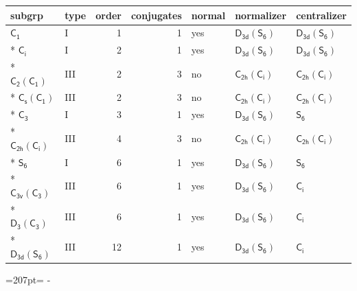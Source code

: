 \documentclass[10pt,a4paper]{article}
\newcommand{\needspace}[1]{\par\penalty-100\begingroup\dimen0=#1\relax\dimen2=\pagegoal
  \advance\dimen2-\pagetotal\ifdim\dimen0>\dimen2\relax\ifdim\dimen2>0pt\vfil\break\fi\fi
  \endgroup}
\numberwithin{equation}{section}
\newcommand{\grp}[1]{\mathsf{#1}}
\begin{document}
{\small\begin{longtable}{@{}llrrlll@{}}\toprule
subgrp & type & order & conjugates & normal & normalizer & centralizer\\\midrule\endhead
\bottomrule\endfoot\endlastfoot
\href{../../../rotation/data/pdf/C1.pdf}{$\grp{C_{1}}$} & I & 1 & 1 & yes & \href{D3d-S6.pdf}{$\grp{D_{3d}}(\grp{S_{6}})$} & \href{D3d-S6.pdf}{$\grp{D_{3d}}(\grp{S_{6}})$}\\*
\href{../../../rotation/data/pdf/S2.pdf}{$\grp{C_{i}}$} & I & 2 & 1 & yes & \href{D3d-S6.pdf}{$\grp{D_{3d}}(\grp{S_{6}})$} & \href{D3d-S6.pdf}{$\grp{D_{3d}}(\grp{S_{6}})$}\\*
\href{C2-C1.pdf}{$\grp{C_{2}}(\grp{C_{1}})$} & III & 2 & 3 & no & \href{C2h-S2.pdf}{$\grp{C_{2h}}(\grp{C_{i}})$} & \href{C2h-S2.pdf}{$\grp{C_{2h}}(\grp{C_{i}})$}\\*
\href{C1v-C1.pdf}{$\grp{C_{s}}(\grp{C_{1}})$} & III & 2 & 3 & no & \href{C2h-S2.pdf}{$\grp{C_{2h}}(\grp{C_{i}})$} & \href{C2h-S2.pdf}{$\grp{C_{2h}}(\grp{C_{i}})$}\\*
\href{../../../rotation/data/pdf/C3.pdf}{$\grp{C_{3}}$} & I & 3 & 1 & yes & \href{D3d-S6.pdf}{$\grp{D_{3d}}(\grp{S_{6}})$} & \href{../../../rotation/data/pdf/S6.pdf}{$\grp{S_{6}}$}\\*
\href{C2h-S2.pdf}{$\grp{C_{2h}}(\grp{C_{i}})$} & III & 4 & 3 & no & \href{C2h-S2.pdf}{$\grp{C_{2h}}(\grp{C_{i}})$} & \href{C2h-S2.pdf}{$\grp{C_{2h}}(\grp{C_{i}})$}\\*
\href{../../../rotation/data/pdf/S6.pdf}{$\grp{S_{6}}$} & I & 6 & 1 & yes & \href{D3d-S6.pdf}{$\grp{D_{3d}}(\grp{S_{6}})$} & \href{../../../rotation/data/pdf/S6.pdf}{$\grp{S_{6}}$}\\*
\href{C3v-C3.pdf}{$\grp{C_{3v}}(\grp{C_{3}})$} & III & 6 & 1 & yes & \href{D3d-S6.pdf}{$\grp{D_{3d}}(\grp{S_{6}})$} & \href{../../../rotation/data/pdf/S2.pdf}{$\grp{C_{i}}$}\\*
\href{D3-C3.pdf}{$\grp{D_{3}}(\grp{C_{3}})$} & III & 6 & 1 & yes & \href{D3d-S6.pdf}{$\grp{D_{3d}}(\grp{S_{6}})$} & \href{../../../rotation/data/pdf/S2.pdf}{$\grp{C_{i}}$}\\*
\href{D3d-S6.pdf}{$\grp{D_{3d}}(\grp{S_{6}})$} & III & 12 & 1 & yes & \href{D3d-S6.pdf}{$\grp{D_{3d}}(\grp{S_{6}})$} & \href{../../../rotation/data/pdf/S2.pdf}{$\grp{C_{i}}$}\\
\bottomrule\end{longtable}}
\needspace{207pt}
\end{document}
